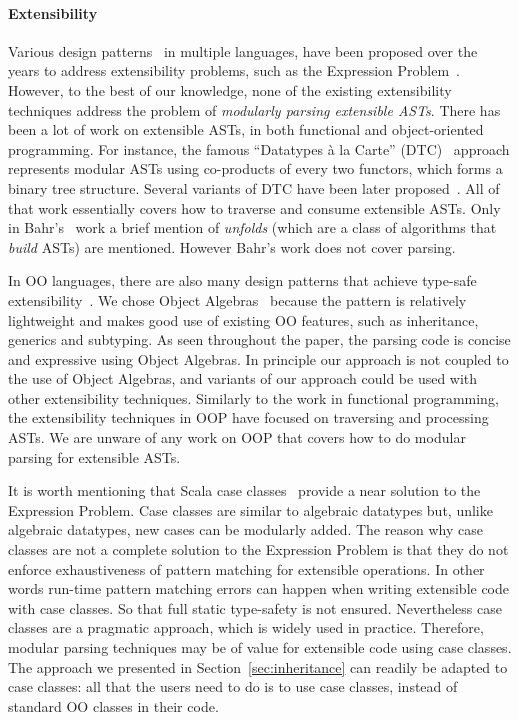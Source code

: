 \paragraph{Extensibility} Various design patterns~\cite{} in multiple
languages, have been proposed over the years to address extensibility
problems, such as the Expression Problem~\cite{wadler1998expression}. However, to the best
of our knowledge, none of the existing extensibility techniques
address the problem of \emph{modularly
parsing extensible ASTs}.  There has been
a lot of work on extensible ASTs, in both functional and
object-oriented programming.  For instance, the famous ``Datatypes \`a
la Carte'' (DTC)~\cite{swierstra2008data} approach represents modular ASTs using co-products
of every two functors, which forms a binary tree structure.
Several variants of DTC have been later proposed~\cite{Bahr2011,Bahr2014,Oliveira2015}.
All of that work essentially covers how to traverse and
consume extensible ASTs.
Only in Bahr's~\cite{Bahr2011} work a brief mention of \emph{unfolds}
(which are a class of algorithms that \emph{build} ASTs) are mentioned.
However Bahr's work does not cover parsing.

In OO languages, there are also many design patterns that achieve
type-safe extensibility~\cite{torgerson,odersky,Oliveira09,Oliveira:2012,Wang16}.
We chose Object Algebras~\cite{Oliveira:2012} because the pattern is
relatively lightweight and makes good use of existing OO features,
such as inheritance, generics and subtyping. As seen throughout the paper,
the parsing code is concise and expressive using Object Algebras.
In principle our approach is not coupled to the use of Object
Algebras, and variants of our approach could be used with other
extensibility techniques. Similarly to the work in functional
programming, the extensibility techniques in OOP have focused
on traversing and processing ASTs. We are unware of any work on OOP
that covers how to do modular parsing for extensible ASTs.

It is worth mentioning that Scala case classes~\cite{} provide a near
solution to the Expression Problem. Case classes are similar to
algebraic datatypes but, unlike algebraic datatypes, new cases can be
modularly added. The reason why case classes are not a complete
solution to the Expression Problem is that they do not enforce
exhaustiveness of pattern matching for extensible operations. In other
words run-time pattern matching errors can happen when writing extensible code with case classes. So that full static type-safety is not ensured. Nevertheless case classes are a pragmatic approach, which is
widely used in practice. Therefore, modular parsing techniques may be
of value for extensible code using case classes.  The approach we
presented in Section~\ref{sec:inheritance} can readily be adapted to case classes:
all that the users need to do is to use case classes, instead of
standard OO classes in their code.

